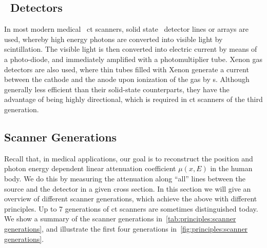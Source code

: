\documentclass[../ml-tct.tex]{subfiles}
\begin{document}
\subsection{\xray\ Detectors}
In most modern medical \xray\ \gls{ct} scanners, solid state \xray\ detector lines or arrays are used, whereby high energy photons are converted into visible light by scintillation.
The visible light is then converted into electric current by means of a photo-diode, and immediately amplified with a photomultiplier tube.
Xenon gas detectors are also used, where thin tubes filled with Xenon generate a current between the cathode and the anode upon ionization of the gas by \xray{}s.
Although generally less efficient than their solid-state counterparts, they have the advantage of being highly directional, which is required in \gls{ct} scanners of the third generation.
\subsection{Scanner Generations}
Recall that, in medical applications, our goal is to reconstruct the position and photon energy dependent linear attenuation coefficient \( \mu(x, E) \) in the human body.
We do this by measuring the attenuation along \enquote{all} lines between the source and the detector in a given cross section.
In this section we will give an overview of different scanner generations, which achieve the above with different principles.
Up to \num{7} generations of \gls{ct} scanners are sometimes distinguished today.
We show a summary of the scanner generations in~\cref{tab:principles:scanner generations}, and illustrate the first four generations in~\cref{fig:principles:scanner generations}.
\end{document}
